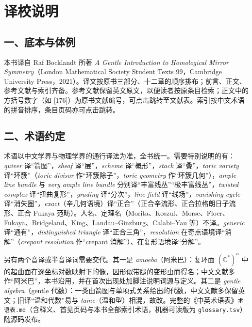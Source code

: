\chapter*{译校说明}

\section*{一、底本与体例}
本书译自 Raf Bocklandt 所著 \textit{A Gentle Introduction to Homological Mirror Symmetry}（London Mathematical Society Student Texts 99，Cambridge University Press，2021）。译文按原书三部分、十二章的顺序排布；前言、正文、参考文献与索引齐备。参考文献保留英文原文，以便读者按原条目检索；正文中的方括号数字（如 [176]）为原书文献编号，可点击跳转至文献表。索引按中文术语的拼音排序，条目页码亦可点击跳转。

\section*{二、术语约定}
术语以中文学界与物理学界的通行译法为准，全书统一。需要特别说明的有：\textit{quiver} 译“箭图”，\textit{sheaf} 译“层”，\textit{scheme} 译“概形”，\textit{stack} 译“叠”，\textit{toric variety} 译“环簇”（\textit{toric divisor} 作“环簇除子”，\textit{toric geometry} 作“环簇几何”），\textit{ample line bundle} 与 \textit{very ample line bundle} 分别译“丰富线丛”“极丰富线丛”，\textit{twisted complex} 译“扭曲复形”，\textit{grading} 译“分次”，\textit{line field} 译“线场”，\textit{vanishing cycle} 译“消失圈”，\textit{exact}（辛几何语境）译“正合”（正合辛流形、正合拉格朗日子流形、正合 Fukaya 范畴）。人名、定理名（Morita、Koszul、Morse、Floer、Fukaya、Bridgeland、King、Landau--Ginzburg、Calabi--Yau 等）不译。\textit{generic} 译“通有”，\textit{distinguished triangle} 译“正合三角”，\textit{resolution} 在奇点语境译“消解”（\textit{crepant resolution} 作“crepant 消解”）、在复形语境译“分解”。

另有两个音译或半音译词需要交代。其一是 \textit{amoeba}（阿米巴）：复环面 $(\mathbb C^*)^n$ 中的超曲面在逐坐标对数映射下的像，因形似带腿的变形虫而得名；中文文献多作“阿米巴”，本书沿用，并在首次出现处加脚注说明词源与定义。其二是 \textit{gentle algebra}（gentle 代数）：一类由箭图与单项式关系给出的代数，中文文献多保留英文；旧译“温和代数”易与 \textit{tame}（温和型）相混，故改。完整的《中英术语表》\texttt{术语表.md}（含释义、首见页码与本书全部索引术语，机器可读版为 \texttt{glossary.tsv}）随源码发布。

